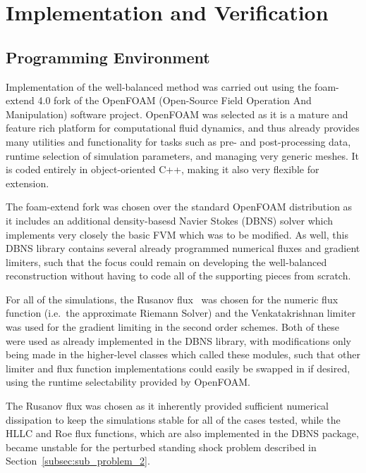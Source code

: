 \chapter{Implementation and Verification}
\label{chap:implementation}

\section{Programming Environment}
\label{sec:environment}

Implementation of the well-balanced method was carried out using the foam-extend 4.0 fork of the OpenFOAM (Open-Source Field Operation And Manipulation) software project. OpenFOAM was selected as it is a mature and feature rich platform for computational fluid dynamics, and thus already provides many utilities and functionality for tasks such as pre- and post-processing data, runtime selection of simulation parameters, and managing very generic meshes. It is coded entirely in object-oriented C++, making it also very flexible for extension.

The foam-extend fork was chosen over the standard OpenFOAM distribution as it includes an additional density-basesd Navier Stokes (DBNS) solver which implements very closely the basic FVM which was to be modified. As well, this DBNS library contains several already programmed numerical fluxes and gradient limiters, such that the focus could remain on developing the well-balanced reconstruction without having to code all of the supporting pieces from scratch.

For all of the simulations, the Rusanov flux~\cite{Rusanov1961} was chosen for the numeric flux function (i.e.\ the approximate Riemann Solver) and the Venkatakrishnan limiter~\cite{Venkatakrishnan1993,Venkatakrishnan1995} was used for the gradient limiting in the second order schemes. Both of these were used as already implemented in the DBNS library, with modifications only being made in the higher-level classes which called these modules, such that other limiter and flux function implementations could easily be swapped in if desired, using the runtime selectability provided by OpenFOAM.

The Rusanov flux was chosen as it inherently provided sufficient numerical dissipation to keep the simulations stable for all of the cases tested, while the HLLC and Roe flux functions, which are also implemented in the DBNS package, became unstable for the perturbed standing shock problem described in Section~\ref{subsec:sub_problem_2}.

